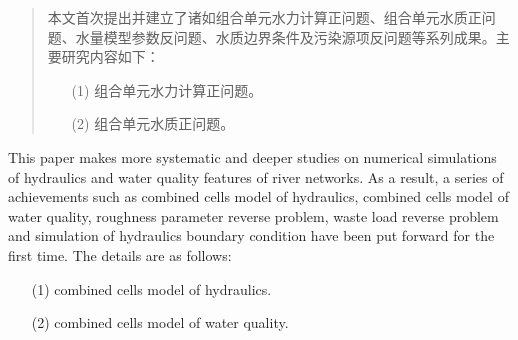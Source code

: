 
\begin{abstract}
	本文首次提出并建立了诸如组合单元水力计算正问题、组合单元水质正问题、水量模型参数反问题、水质边界条件及污染源项反问题等系列成果。主要研究内容如下：
\begin{enumerate}
	\item[(1)] 组合单元水力计算正问题。
	\item[(2)] 组合单元水质正问题。
\end{enumerate}


\end{abstract}

\begin{enabstract}
	This paper makes more systematic and deeper studies on numerical simulations of hydraulics and water quality features of river networks. As a result, a series of achievements such as combined cells model of hydraulics, combined cells model of water quality, roughness parameter reverse problem, waste load reverse problem and simulation of hydraulics boundary condition have been put forward for the first time. The details are as follows:

\begin{enumerate}
\item[(1)] combined cells model of hydraulics.
\item[(2)] combined cells model of water quality.
\end{enumerate}  
 

\end{enabstract}
